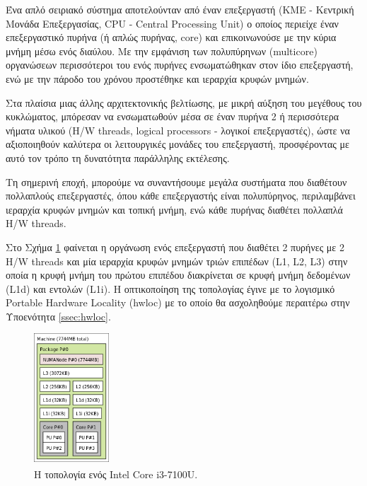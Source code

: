 Ένα απλό σειριακό σύστημα αποτελούνταν από έναν επεξεργαστή (ΚΜΕ - Κεντρική Μονάδα Επεξεργασίας, CPU - Central Processing Unit) ο οποίος περιείχε έναν επεξεργαστικό πυρήνα (ή απλώς πυρήνας, core) και επικοινωνούσε με την κύρια μνήμη μέσω ενός διαύλου. Με την εμφάνιση των πολυπύρηνων (multicore) οργανώσεων περισσότεροι του ενός πυρήνες ενσωματώθηκαν στον ίδιο επεξεργαστή, ενώ με την πάροδο του χρόνου προστέθηκε και ιεραρχία κρυφών μνημών.

Στα πλαίσια μιας άλλης αρχιτεκτονικής βελτίωσης, με μικρή αύξηση του μεγέθους του κυκλώματος, μπόρεσαν να ενσωματωθούν μέσα σε έναν πυρήνα 2 ή περισσότερα νήματα υλικού (H/W threads, logical processors - λογικοί επεξεργαστές), ώστε να αξιοποιηθούν καλύτερα οι λειτουργικές μονάδες του επεξεργαστή, προσφέροντας με αυτό τον τρόπο τη δυνατότητα παράλληλης εκτέλεσης.

Τη σημερινή εποχή, μπορούμε να συναντήσουμε μεγάλα συστήματα που διαθέτουν πολλαπλούς επεξεργαστές, όπου κάθε επεξεργαστής είναι πολυπύρηνος, περιλαμβάνει ιεραρχία κρυφών μνημών και τοπική μνήμη, ενώ κάθε πυρήνας διαθέτει πολλαπλά H/W threads.

Στο Σχήμα \ref{fig:ideapad-topo} φαίνεται η οργάνωση ενός επεξεργαστή που διαθέτει 2 πυρήνες με 2 H/W threads και μία ιεραρχία κρυφών μνημών τριών επιπέδων (L1, L2, L3) στην οποία η κρυφή μνήμη του πρώτου επιπέδου διακρίνεται σε κρυφή μνήμη δεδομένων (L1d) και εντολών (L1i). Η οπτικοποίηση της τοπολογίας έγινε με το λογισμικό Portable Hardware Locality (hwloc) με το οποίο θα ασχοληθούμε περαιτέρω στην Υποενότητα \ref{ssec:hwloc}.

\begin{figure}[t]
	\centering
	\includegraphics[width=0.25\textwidth]{Figures/ideapad-topo.png}
	\linebreak
	\caption{Η τοπολογία ενός Intel\textsuperscript{\textregistered} Core\textsuperscript{\texttrademark} i3-7100U.}
	\label{fig:ideapad-topo}
\end{figure}


